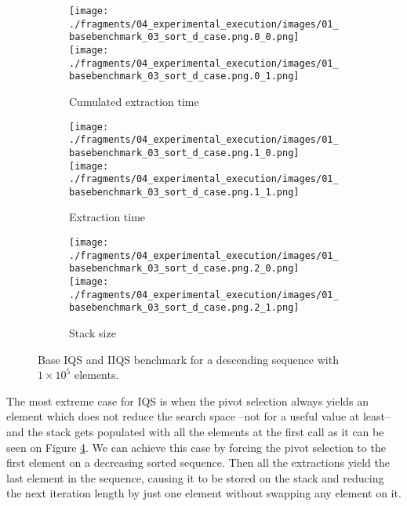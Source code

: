\begin{figure}
    \centering
    \begin{subfigure}[b]{\textwidth}
        \centering
        \texttt{[image: ./fragments/04\_experimental\_execution/images/01\_basebenchmark\_03\_sort\_d\_case.png.0\_0.png]}
        \texttt{[image: ./fragments/04\_experimental\_execution/images/01\_basebenchmark\_03\_sort\_d\_case.png.0\_1.png]}
        \caption{Cumulated extraction time}
        \label{FIG:BENCHMARK_03_DESC_CASE__0_0}
    \end{subfigure}

    \begin{subfigure}[b]{\textwidth}
        \centering
        \texttt{[image: ./fragments/04\_experimental\_execution/images/01\_basebenchmark\_03\_sort\_d\_case.png.1\_0.png]}
        \texttt{[image: ./fragments/04\_experimental\_execution/images/01\_basebenchmark\_03\_sort\_d\_case.png.1\_1.png]}
        \caption{Extraction time}
        \label{FIG:BENCHMARK_03_DESC_CASE__0_1}
    \end{subfigure}

    \begin{subfigure}[b]{\textwidth}
        \centering
        \texttt{[image: ./fragments/04\_experimental\_execution/images/01\_basebenchmark\_03\_sort\_d\_case.png.2\_0.png]}
        \texttt{[image: ./fragments/04\_experimental\_execution/images/01\_basebenchmark\_03\_sort\_d\_case.png.2\_1.png]}
        \caption{Stack size}
        \label{FIG:BENCHMARK_03_DESC_CASE__0_2}
    \end{subfigure}
    
    \caption{Base IQS and IIQS benchmark for a descending sequence with $1\times10^5$ elements.}
    \label{FIG:BENCHMARK_03_DESC_CASE}
\end{figure}

The most extreme case for IQS is when the pivot selection always yields an element which does not reduce the search space --not for a useful value at least-- and the stack gets populated with all the elements at the first call as it can be seen on Figure \ref{FIG:BENCHMARK_03_DESC_CASE}. We can achieve this case by forcing the pivot selection to the first element on a decreasing sorted sequence. Then all the extractions yield the last element in the sequence, causing it to be stored on the stack and reducing the next iteration length by just one element without swapping any element on it.\\

